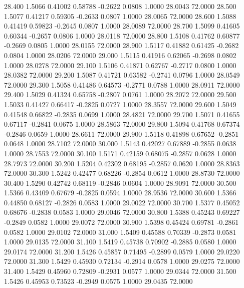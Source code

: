   28.400   1.5066   0.41002   0.58788  -0.2622   0.0808   1.0000  28.0043  72.0000
  28.500   1.5077   0.41217   0.59305  -0.2633   0.0807   1.0000  28.0065  72.0000
  28.600   1.5088   0.41419   0.59823  -0.2645   0.0807   1.0000  28.0089  72.0000
  28.700   1.5099   0.41605   0.60344  -0.2657   0.0806   1.0000  28.0118  72.0000
  28.800   1.5108   0.41762   0.60877  -0.2669   0.0805   1.0000  28.0155  72.0000
  28.900   1.5117   0.41882   0.61425  -0.2682   0.0804   1.0000  28.0206  72.0000
  29.000   1.5115   0.41916   0.62065  -0.2698   0.0802   1.0000  28.0278  72.0000
  29.100   1.5106   0.41871   0.62767  -0.2717   0.0800   1.0000  28.0382  72.0000
  29.200   1.5087   0.41721   0.63582  -0.2741   0.0796   1.0000  28.0549  72.0000
  29.300   1.5058   0.41486   0.64573  -0.2771   0.0788   1.0000  28.0911  72.0000
  29.400   1.5029   0.41324   0.65758  -0.2807   0.0761   1.0000  28.2072  72.0000
  29.500   1.5033   0.41427   0.66417  -0.2825   0.0727   1.0000  28.3557  72.0000
  29.600   1.5049   0.41548   0.66822  -0.2835   0.0699   1.0000  28.4821  72.0000
  29.700   1.5071   0.41655   0.67117  -0.2841   0.0675   1.0000  28.5863  72.0000
  29.800   1.5094   0.41768   0.67374  -0.2846   0.0659   1.0000  28.6611  72.0000
  29.900   1.5118   0.41898   0.67652  -0.2851   0.0648   1.0000  28.7102  72.0000
  30.000   1.5143   0.42027   0.67889  -0.2855   0.0638   1.0000  28.7553  72.0000
  30.100   1.5171   0.42159   0.68075  -0.2857   0.0628   1.0000  28.7973  72.0000
  30.200   1.5204   0.42302   0.68195  -0.2857   0.0620   1.0000  28.8363  72.0000
  30.300   1.5242   0.42477   0.68226  -0.2854   0.0612   1.0000  28.8730  72.0000
  30.400   1.5290   0.42742   0.68119  -0.2846   0.0604   1.0000  28.9091  72.0000
  30.500   1.5366   0.43409   0.67679  -0.2825   0.0594   1.0000  28.9536  72.0000
  30.600   1.5366   0.44850   0.68127  -0.2826   0.0583   1.0000  29.0022  72.0000
  30.700   1.5377   0.45052   0.68676  -0.2838   0.0583   1.0000  29.0046  72.0000
  30.800   1.5388   0.45243   0.69227  -0.2849   0.0582   1.0000  29.0072  72.0000
  30.900   1.5398   0.45424   0.69781  -0.2861   0.0582   1.0000  29.0102  72.0000
  31.000   1.5409   0.45588   0.70339  -0.2873   0.0581   1.0000  29.0135  72.0000
  31.100   1.5419   0.45738   0.70902  -0.2885   0.0580   1.0000  29.0174  72.0000
  31.200   1.5426   0.45857   0.71495  -0.2899   0.0579   1.0000  29.0220  72.0000
  31.300   1.5429   0.45930   0.72134  -0.2914   0.0578   1.0000  29.0275  72.0000
  31.400   1.5429   0.45960   0.72809  -0.2931   0.0577   1.0000  29.0344  72.0000
  31.500   1.5426   0.45953   0.73523  -0.2949   0.0575   1.0000  29.0435  72.0000
